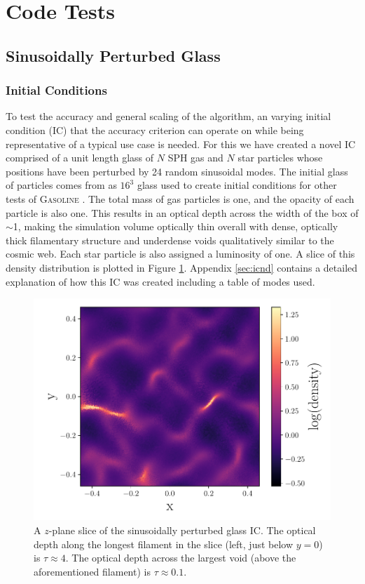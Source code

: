 \documentclass[fleq,usenatbib]{mnras}
\begin{document}
\section{Code Tests}\label{sec:tsts}
\subsection{Sinusoidally Perturbed Glass}
\subsubsection{Initial Conditions}
To test the accuracy and general scaling of the algorithm, an varying initial 
condition (IC) that the accuracy criterion can operate on while being 
representative of a typical use case is needed. For this we have created a 
novel IC comprised of a unit length glass of $N$ SPH gas and $N$ star 
particles whose positions have been perturbed by 24 random sinusoidal modes. 
The initial glass of particles comes from as $16^3$ glass used to create 
initial conditions for other tests of \textsc{Gasoline} \citep{wadsleyEt17}. 
The total mass of gas particles is one, and the opacity of each particle is 
also one. This results in an optical depth across the width of the box of 
$\sim$1, making the simulation volume optically thin overall with dense, 
optically thick filamentary structure and underdense voids qualitatively 
similar to the cosmic web. Each star particle is also assigned a luminosity of 
one. A slice of this density distribution is plotted in Figure 
\ref{fig:sine_rho}. Appendix \ref{sec:icnd} contains a detailed explanation of 
how this IC was created including a table of modes used.
\begin{figure}
\includegraphics[width=1\linewidth]{Figures/sine_rho.pdf}
\caption{A $z$-plane slice of the sinusoidally perturbed glass IC. The optical 
depth along the longest filament in the slice (left, just below $y=0$) is
$\tau\approx 4$. The optical depth across the largest void (above the 
aforementioned filament) is $\tau\approx 0.1$.}
\label{fig:sine_rho}
\end{figure}
\end{document}
